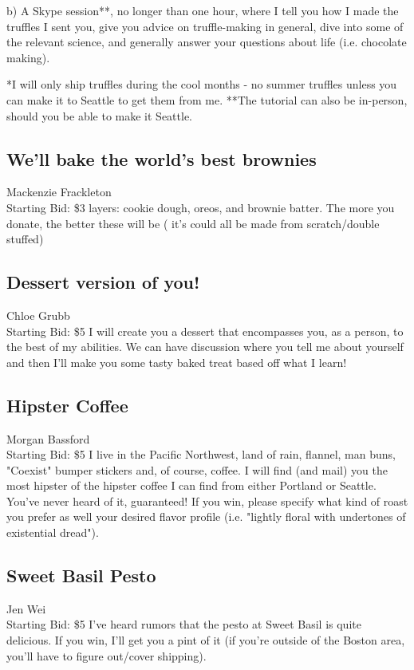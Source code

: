 \documentclass[11pt]{article}
\begin{document}
    b) A Skype session**, no longer than one hour, where I tell you how I made the truffles I sent you, give you advice on truffle-making in general, dive into some of the relevant science, and generally answer your questions about life (i.e. chocolate making).

*I will only ship truffles during the cool months - no summer truffles unless you can make it to Seattle to get them from me.
**The tutorial can also be in-person, should you be able to make it Seattle.
\subsection{We'll bake the world's best brownies }
Mackenzie Frackleton
\\
Starting Bid: \$3
 layers: cookie dough, oreos, and brownie batter. The more you donate, the better these will be ( it's could all be made from scratch/double stuffed)
\subsection{Dessert version of you!}
Chloe Grubb
\\
Starting Bid: \$5
\newline
I will create you a dessert that encompasses you, as a person, to the best of my abilities. We can have  discussion where you tell me about yourself and then I'll make you some tasty baked treat based off what I learn!
\subsection{Hipster Coffee}
Morgan Bassford
\\
Starting Bid: \$5
\newline
I live in the Pacific Northwest, land of rain, flannel, man buns, "Coexist" bumper stickers and, of course, coffee. I will find (and mail) you the most hipster of the hipster coffee I can find from either Portland or Seattle. You've never heard of it, guaranteed! If you win, please specify what kind of roast you prefer as well your desired flavor profile (i.e. "lightly floral with undertones of existential dread").
\subsection{Sweet Basil Pesto}
Jen Wei
\\
Starting Bid: \$5
\newline
I've heard rumors that the pesto at Sweet Basil is quite delicious. If you win, I'll get you a pint of it (if you're outside of the Boston area, you'll have to figure out/cover shipping).
\end{document}

